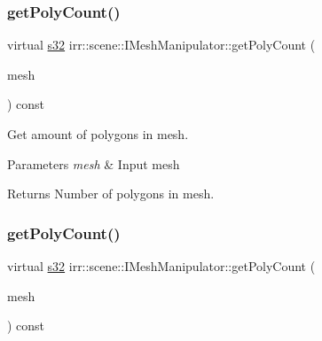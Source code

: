 \subsubsection{\texorpdfstring{get\+Poly\+Count()}{getPolyCount()}\hspace{0.1cm}{\footnotesize\ttfamily [3/4]}}
{\footnotesize\ttfamily virtual \hyperlink{namespaceirr_ac66849b7a6ed16e30ebede579f9b47c6}{s32} irr\+::scene\+::\+I\+Mesh\+Manipulator\+::get\+Poly\+Count (\begin{DoxyParamCaption}\item[{\hyperlink{classirr_1_1scene_1_1IAnimatedMesh}{I\+Animated\+Mesh} $\ast$}]{mesh }\end{DoxyParamCaption}) const\hspace{0.3cm}{\ttfamily [pure virtual]}}



Get amount of polygons in mesh. 


\begin{DoxyParams}{Parameters}
{\em mesh} & Input mesh \\
\hline
\end{DoxyParams}
\begin{DoxyReturn}{Returns}
Number of polygons in mesh. 
\end{DoxyReturn}
\mbox{\label{classirr_1_1scene_1_1IMeshManipulator_af20519dbaa2c2c346e8ddf7c94babc38}} 
\subsubsection{\texorpdfstring{get\+Poly\+Count()}{getPolyCount()}\hspace{0.1cm}{\footnotesize\ttfamily [4/4]}}
{\footnotesize\ttfamily virtual \hyperlink{namespaceirr_ac66849b7a6ed16e30ebede579f9b47c6}{s32} irr\+::scene\+::\+I\+Mesh\+Manipulator\+::get\+Poly\+Count (\begin{DoxyParamCaption}\item[{\hyperlink{classirr_1_1scene_1_1IAnimatedMesh}{I\+Animated\+Mesh} $\ast$}]{mesh }\end{DoxyParamCaption}) const\hspace{0.3cm}{\ttfamily [pure virtual]}}



